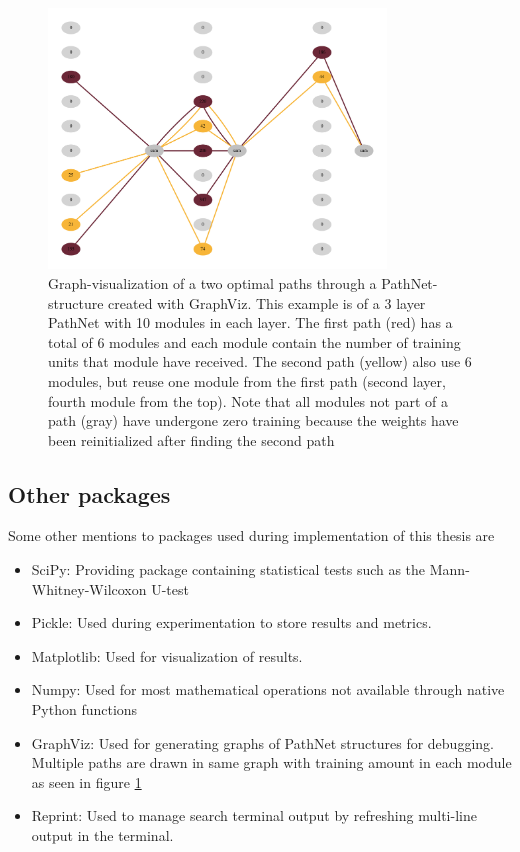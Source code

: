\begin{figure}[ht]
    \centering
    \includegraphics[width=0.8\textwidth]{Chapters/3.Implementation/figures/pathnet_visualization.pdf}
    \caption[GraphViz example]{Graph-visualization of a two optimal paths through a PathNet-structure created with GraphViz. This example is of a 3 layer PathNet with 10 modules in each layer. The first path (red) has a total of 6 modules and each module contain the number of training units that module have received. The second path (yellow) also use 6 modules, but reuse one module from the first path (second layer, fourth module from the top). Note that all modules not part of a path (gray) have undergone zero training because the weights have been reinitialized after finding the second path}
    \label{fig:pathnetexample}
\end{figure}

\subsection{Other packages}
Some other mentions to packages used during implementation of this thesis are
\begin{itemize}
    \item SciPy: Providing package containing statistical tests such as the Mann-Whitney-Wilcoxon U-test
    \item Pickle: Used during experimentation to store results and metrics.
    \item Matplotlib: Used for visualization of results.
    \item Numpy: Used for most mathematical operations not available through native Python functions 
    \item GraphViz: Used for generating graphs of PathNet structures for debugging. Multiple paths are drawn in same graph with training amount in each module as seen in figure \ref{fig:pathnetexample}
    \item Reprint: Used to manage search terminal output by refreshing multi-line output in the terminal.
\end{itemize}

